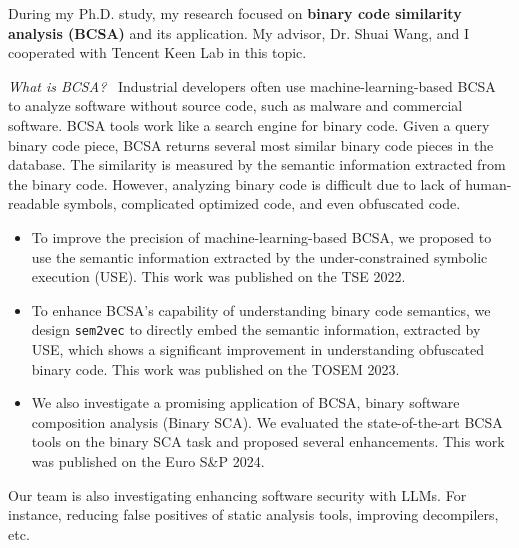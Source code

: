 



During my Ph.D. study, my research focused on \textbf{binary code similarity
analysis (BCSA)} and its application.
My advisor, Dr. Shuai Wang, and I cooperated with Tencent Keen Lab
in this topic.

\smallskip
\textit{What is BCSA?}~
Industrial developers often use machine-learning-based BCSA to analyze
software without source code, such as malware and commercial software.
BCSA tools work like a search engine for binary code. Given a query binary
code piece, BCSA returns several most similar binary code pieces in the
database. The similarity is measured by the semantic information extracted
from the binary code. However, analyzing binary code is difficult due to
lack of human-readable symbols, complicated optimized code, and even
obfuscated code.

\begin{itemize}
    \item To improve the precision of machine-learning-based BCSA, we proposed
    to use the semantic information extracted by the under-constrained
    symbolic execution (USE). This work was published on the TSE 2022.

    \item To enhance BCSA's capability of understanding binary code semantics,
    we design \texttt{sem2vec} to directly embed the semantic information,
    extracted by USE,
    which shows a significant improvement in understanding
    obfuscated binary code. This work was published on the TOSEM 2023.

    \item We also investigate a promising application of BCSA, binary software
    composition analysis (Binary SCA). We evaluated the state-of-the-art BCSA tools
    on the binary SCA task and proposed several enhancements. This work was
    published on the Euro S\&P 2024.

\end{itemize}

Our team is also investigating enhancing software security with LLMs. For instance,
reducing false positives of static analysis tools, improving decompilers, etc.
